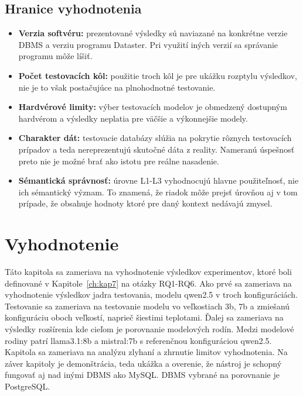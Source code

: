 \section{Hranice vyhodnotenia}
\label{sub:k7_hranice_vyhodnotenia}
\begin{itemize}
    \item \textbf{Verzia softvéru:} prezentované výsledky sú naviazané na konkrétne verzie DBMS a verziu programu Dataster. Pri využití iných verzií sa správanie programu môže líšiť. 
    \item \textbf{Počet testovacích kôl:} použitie troch kôl je pre ukážku rozptylu výsledkov, nie je to však postačujúce na plnohodnotné testovanie.
    \item \textbf{Hardvérové limity:} výber testovacích modelov je obmedzený dostupným hardvérom a výsledky neplatia pre väčšie a výkonnejšie modely.
    \item \textbf{Charakter dát:} testovacie databázy slúžia na pokrytie rôznych testovacích prípadov a teda nereprezentujú skutočné dáta z reality. Nameranú úspešnosť preto nie je možné brať ako istotu pre reálne nasadenie.
    \item \textbf{Sémantická správnosť:} úrovne L1-L3 vyhodnocujú hlavne použiteľnosť, nie ich sémantický význam. To znamená, že riadok môže prejsť úrovňou aj v tom prípade, že obsahuje hodnoty ktoré pre daný kontext nedávajú zmysel.
\end{itemize}



\chapter{Vyhodnotenie}
\label{ch:kap8}
Táto kapitola sa zameriava na vyhodnotenie výsledkov experimentov, ktoré boli definované v Kapitole~\ref{ch:kap7} na otázky RQ1-RQ6. Ako prvé sa zameriava na vyhodnotenie výsledkov jadra testovania, modelu qwen2.5 v troch konfiguráciách. Testovanie sa zameriava na testovanie modelu vo veľkostiach 3b, 7b a zmiešanú konfiguráciu oboch veľkostí, naprieč šiestimi teplotami. Ďalej sa zameriava na výsledky rozšírenia kde cieľom je porovnanie modelových rodín. Medzi modelové rodiny patrí llama3.1:8b a mistral:7b s referenčnou konfiguráciou qwen2.5. Kapitola sa zameriava na analýzu zlyhaní a zhrnutie limitov vyhodnotenia. Na záver kapitoly je demonštrácia, teda ukážka a overenie, že nástroj je schopný fungovať aj nad inými DBMS ako MySQL. DBMS vybrané na porovnanie je PostgreSQL. 

